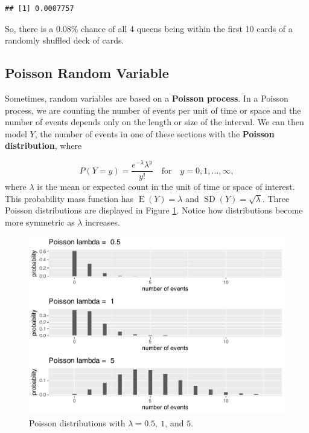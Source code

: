\documentclass[
]{krantz}
\newcommand{\E}{\operatorname{E}}
\newcommand{\SD}{\operatorname{SD}}
\begin{document}
\begin{verbatim}
## [1] 0.0007757
\end{verbatim}

So, there is a 0.08\% chance of all 4 queens being within the first 10 cards of a randomly shuffled deck of cards.

\subsection{Poisson Random Variable}\label{poisson-random-variable}

Sometimes, random variables are based on a \textbf{Poisson process}.  In a Poisson process, we are counting the number of events per unit of time or space and the number of events depends only on the length or size of the interval.
We can then model \(Y\), the number of events in one of these sections with the \textbf{Poisson distribution},  where

\begin{equation}
P(Y=y) = \frac{e^{-\lambda}\lambda^y}{y!} \quad \textrm{for} \quad y = 0, 1, \ldots, \infty,
\label{eq:poissRV}
\end{equation}
where \(\lambda\) is the mean or expected count in the unit of time or space of interest.
This probability mass function has \(\E(Y) = \lambda\) and \(\SD(Y) = \sqrt{\lambda}\). Three Poisson distributions are displayed in Figure \ref{fig:multPois}. Notice how distributions become more symmetric as \(\lambda\) increases.



\begin{figure}

{\centering \includegraphics[width=0.6\linewidth]{bookdown-BeyondMLR_files/figure-latex/multPois-1} 

}

\caption{Poisson distributions with \(\lambda = 0.5,\ 1\), and \(5\).}\label{fig:multPois}
\end{figure}
\end{document}
